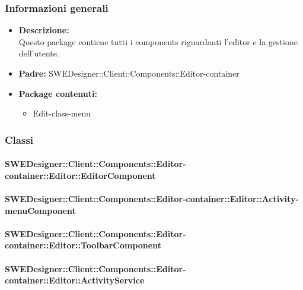 		\subsubsection{Informazioni generali}
			\begin{itemize}
          		\item \textbf{Descrizione:}\\
          		Questo package contiene tutti i components riguardanti l'editor e la gestione dell'utente.
          		\item \textbf{Padre:} SWEDesigner::Client::Components::Editor-container
          		\item \textbf{Package contenuti:}\\
          		\begin{itemize}
          			\item Edit-class-menu\\
          		\end{itemize}
          	\end{itemize}
          	
		\subsubsection{Classi}
		
			\paragraph{SWEDesigner::Client::Components::Editor-container::Editor::EditorComponent}
				
				
			\paragraph{SWEDesigner::Client::Components::Editor-container::Editor::Activity-menuComponent}
				
				
			\paragraph{SWEDesigner::Client::Components::Editor-container::Editor::ToolbarComponent}
				
				
			\paragraph{SWEDesigner::Client::Components::Editor-container::Editor::ActivityService}
				
				
